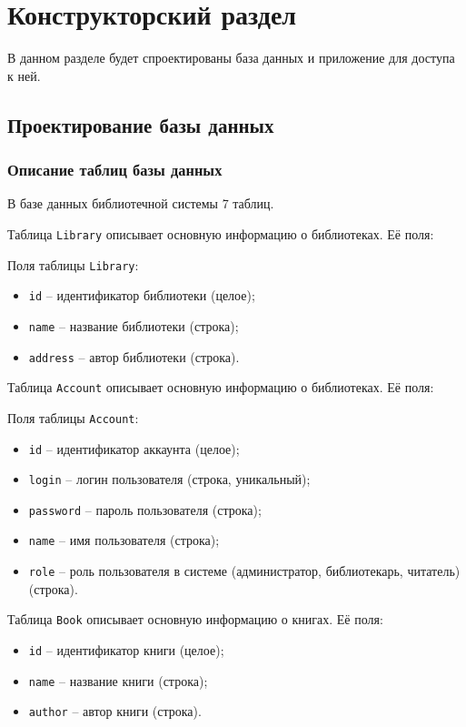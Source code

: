 \chapter{Конструкторский раздел}

В данном разделе будет спроектированы база данных и приложение для доступа к ней.

\section{Проектирование базы данных}

\subsection{Описание таблиц базы данных}
В базе данных библиотечной системы 7 таблиц. 

Таблица \texttt{Library} описывает основную информацию о библиотеках. Её поля:

Поля таблицы \texttt{Library}:
\begin{itemize}
	\item \texttt{id} -- идентификатор библиотеки (целое);
	\item \texttt{name} -- название библиотеки (строка);
	\item \texttt{address} -- автор библиотеки (строка).
\end{itemize}

Таблица \texttt{Account} описывает основную информацию о библиотеках. Её поля:

Поля таблицы \texttt{Account}:
\begin{itemize}
	\item \texttt{id} -- идентификатор аккаунта (целое);
	\item \texttt{login} -- логин пользователя (строка, уникальный);
	\item \texttt{password} -- пароль пользователя (строка);
	\item \texttt{name} -- имя пользователя (строка);
	\item \texttt{role} -- роль пользователя в системе (администратор, библиотекарь, читатель) (строка).
\end{itemize}

Таблица \texttt{Book} описывает основную информацию о книгах. Её поля:
\begin{itemize}
	\item \texttt{id} -- идентификатор книги (целое);
	\item \texttt{name} -- название книги (строка);
	\item \texttt{author} -- автор книги (строка).
\end{itemize}

